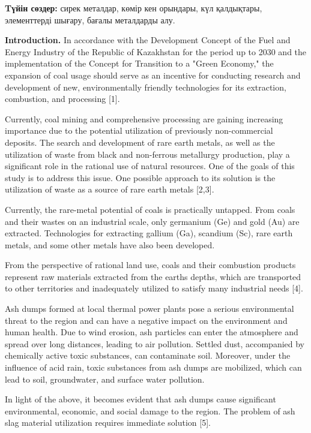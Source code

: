 \textbf{Tүйін сөздер:} сирек металдар, көмір кен орындары, күл
қалдықтары, элементтерді шығару, бағалы металдарды алу.

\textbf{Introduction.} In accordance with the Development Concept of the
Fuel and Energy Industry of the Republic of Kazakhstan for the period up
to 2030 and the implementation of the Concept for Transition to a "Green
Economy," the expansion of coal usage should serve as an incentive for
conducting research and development of new, environmentally friendly
technologies for its extraction, combustion, and processing {[}1{]}.

Currently, coal mining and comprehensive processing are gaining
increasing importance due to the potential utilization of previously
non-commercial deposits. The search and development of rare earth
metals, as well as the utilization of waste from black and non-ferrous
metallurgy production, play a significant role in the rational use of
natural resources. One of the goals of this study is to address this
issue. One possible approach to its solution is the utilization of waste
as a source of rare earth metals {[}2,3{]}.

Currently, the rare-metal potential of coals is practically untapped.
From coals and their wastes on an industrial scale, only germanium (Ge)
and gold (Au) are extracted. Technologies for extracting gallium (Ga),
scandium (Sc), rare earth metals, and some other metals have also been
developed.

From the perspective of rational land use, coals and their combustion
products represent raw materials extracted from the
earth\textquotesingle s depths, which are transported to other
territories and inadequately utilized to satisfy many industrial needs
{[}4{]}.

Ash dumps formed at local thermal power plants pose a serious
environmental threat to the region and can have a negative impact on the
environment and human health. Due to wind erosion, ash particles can
enter the atmosphere and spread over long distances, leading to air
pollution. Settled dust, accompanied by chemically active toxic
substances, can contaminate soil. Moreover, under the influence of acid
rain, toxic substances from ash dumps are mobilized, which can lead to
soil, groundwater, and surface water pollution.

In light of the above, it becomes evident that ash dumps cause
significant environmental, economic, and social damage to the region.
The problem of ash slag material utilization requires immediate solution
{[}5{]}.

